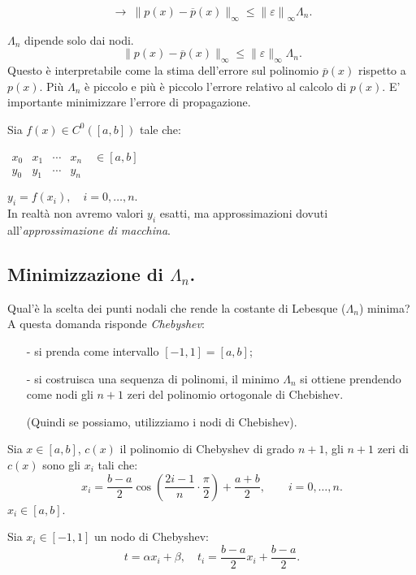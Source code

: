 \[\longrightarrow\ \|p(x) - \overline{p}(x) \|_{\infty} \leq  \left\|
\varepsilon\right\|_{\infty}\Lambda_n.\]

\begin{osse}
$\Lambda_n$ dipende solo dai nodi.
\[
\|p(x) -\overline{p}(x)\|_{\infty} \leq \|\varepsilon\|_{\infty}\Lambda_n.
\]
Questo è interpretabile come la stima dell'errore sul polinomio
$\overline{p}(x)$ rispetto a $p(x)$. Più $\Lambda_n$ è piccolo e più è
piccolo l'errore relativo al calcolo di $p(x)$. E' importante minimizzare
l'errore di propagazione.
\end{osse}

Sia $f(x) \in C^0([a,b])$ tale che:
\begin{flushleft}$\begin{array}{cccl}
x_0 & x_1 & \cdots & x_n  \quad \in [a,b] \\
y_0 & y_1 & \cdots & y_n
\end{array}$\end{flushleft}
$y_i = f(x_i), \quad i=0,\ldots,n.$\\

In realtà non avremo valori $y_i$ esatti, ma approssimazioni dovuti
all'\emph{approssimazione di macchina}.

\subsection{Minimizzazione di $\Lambda_n$.}
Qual'è la scelta dei punti nodali che rende la costante di Lebesque
($\Lambda_n$) minima? A questa domanda risponde \emph{Chebyshev}:
\begin{itemize}
\item[-] si prenda come intervallo $[-1,1] = [a,b]$;
\item[-] si costruisca una sequenza di polinomi, il minimo $\Lambda_n$ si
ottiene prendendo come nodi gli $n+1$ zeri del polinomio ortogonale di
Chebishev.
\item[] (Quindi se possiamo, utilizziamo i nodi di Chebishev).
\end{itemize}

\begin{defi}Sia $x \in [a,b]$, $c(x)$ il polinomio di Chebyshev di grado
$n+1$, gli $n+1$
zeri di $c(x)$ sono gli $x_i$ tali che:
\[
x_i = \frac{b -a}{2}\cos \left( \frac{2i-1}{n}  \cdot \frac{\pi}{2}\right) +
\frac{a+b}{2}, \qquad i = 0, \ldots, n.
\]
$x_i \in [a,b]$.
\end{defi}

Sia $x_i \in [-1,1]$ un nodo di Chebyshev:
\[t = \alpha x_i + \beta, \quad t_i = \frac{b-a}{2}x_i + \frac{b-a}{2}.\]

